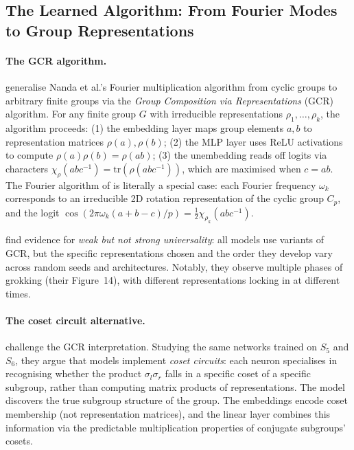 \documentclass[11pt,a4paper]{article}
\begin{document}
\subsection{The Learned Algorithm: From Fourier Modes to Group Representations}\label{sec:background_algo}

\paragraph{The GCR algorithm.} \citet{chughtai2023toy} generalise Nanda et al.'s Fourier multiplication algorithm from cyclic groups to arbitrary finite groups via the \emph{Group Composition via Representations} (GCR) algorithm. For any finite group $G$ with irreducible representations $\rho_1, \ldots, \rho_k$, the algorithm proceeds: (1) the embedding layer maps group elements $a, b$ to representation matrices $\rho(a), \rho(b)$; (2) the MLP layer uses ReLU activations to compute $\rho(a)\rho(b) = \rho(ab)$; (3) the unembedding reads off logits via characters $\chi_\rho(abc^{-1}) = \mathrm{tr}(\rho(abc^{-1}))$, which are maximised when $c = ab$. The Fourier algorithm of \citet{nanda2023progress} is literally a special case: each Fourier frequency $\omega_k$ corresponds to an irreducible 2D rotation representation of the cyclic group $C_p$, and the logit $\cos(2\pi\omega_k(a+b-c)/p) = \frac{1}{2}\chi_{\rho_k}(abc^{-1})$.

\citet{chughtai2023toy} find evidence for \emph{weak but not strong universality}: all models use variants of GCR, but the specific representations chosen and the order they develop vary across random seeds and architectures. Notably, they observe multiple phases of grokking (their Figure~14), with different representations locking in at different times.

\paragraph{The coset circuit alternative.} \citet{stander2024grokking} challenge the GCR interpretation. Studying the same networks trained on $S_5$ and $S_6$, they argue that models implement \emph{coset circuits}: each neuron specialises in recognising whether the product $\sigma_l \sigma_r$ falls in a specific coset of a specific subgroup, rather than computing matrix products of representations. The model discovers the true subgroup structure of the group. The embeddings encode coset membership (not representation matrices), and the linear layer combines this information via the predictable multiplication properties of conjugate subgroups' cosets.
\end{document}
